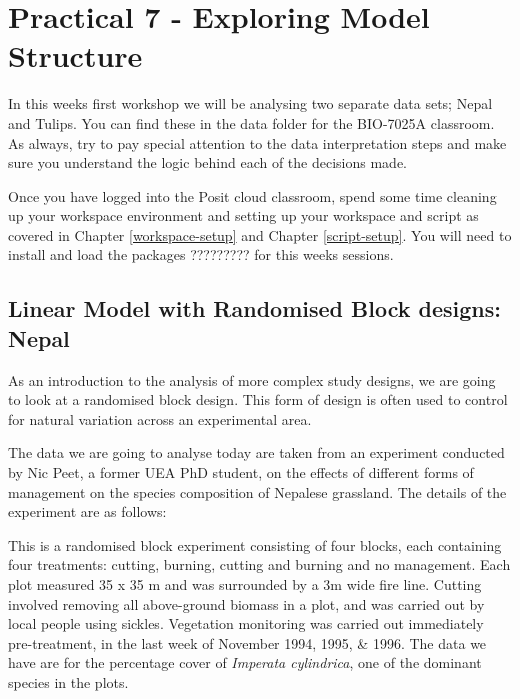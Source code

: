 \documentclass[
]{book}
\begin{document}
\hypertarget{practical-7---exploring-model-structure}{%
\section{Practical 7 - Exploring Model Structure}\label{practical-7---exploring-model-structure}}

In this weeks first workshop we will be analysing two separate data sets; Nepal and Tulips. You can find these in the data folder for the BIO-7025A classroom. As always, try to pay special attention to the data interpretation steps and make sure you understand the logic behind each of the decisions made.

Once you have logged into the Posit cloud classroom, spend some time cleaning up your workspace environment and setting up your workspace and script as covered in Chapter \ref{workspace-setup} and Chapter \ref{script-setup}. You will need to install and load the packages ????????? for this weeks sessions.

\hypertarget{linear-model-with-randomised-block-designs-nepal}{%
\subsection{Linear Model with Randomised Block designs: Nepal}\label{linear-model-with-randomised-block-designs-nepal}}

As an introduction to the analysis of more complex study designs, we are going to look at a randomised block design. This form of design is often used to control for natural variation across an experimental area.

The data we are going to analyse today are taken from an experiment conducted by Nic Peet, a former UEA PhD student, on the effects of different forms of management on the species composition of Nepalese grassland. The details of the experiment are as follows:

This is a randomised block experiment consisting of four blocks, each containing four treatments: cutting, burning, cutting and burning and no management. Each plot measured 35 x 35 m and was surrounded by a 3m wide fire line. Cutting involved removing all above-ground biomass in a plot, and was carried out by local people using sickles. Vegetation monitoring was carried out immediately pre-treatment, in the last week of November 1994, 1995, \& 1996. The data we have are for the percentage cover of \emph{Imperata cylindrica}, one of the dominant species in the plots.
\end{document}

